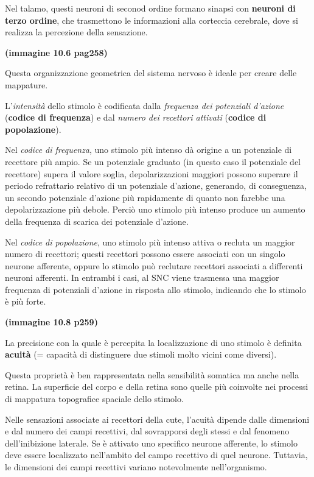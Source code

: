 \documentclass[]{article}
\begin{document}
Nel talamo, questi neuroni di seconod ordine formano sinapsi con
\textbf{neuroni di terzo ordine}, che trasmettono le informazioni alla
corteccia cerebrale, dove si realizza la percezione della sensazione.

\textbf{(immagine 10.6 pag258)}

Questa organizzazione geometrica del sistema nervoso è ideale per creare
delle mappature.

L'\emph{intensità} dello stimolo è codificata dalla \emph{frequenza dei
potenziali d'azione} (\textbf{codice di frequenza}) e dal \emph{numero
dei recettori attivati} (\textbf{codice di popolazione}).

Nel \emph{codice di frequenza}, uno stimolo più intenso dà origine a un
potenziale di recettore più ampio. Se un potenziale graduato (in questo
caso il potenziale del recettore) supera il valore soglia,
depolarizzazioni maggiori possono superare il periodo refrattario
relativo di un potenziale d'azione, generando, di conseguenza, un
secondo potenziale d'azione più rapidamente di quanto non farebbe una
depolarizzazione più debole. Perciò uno stimolo più intenso produce un
aumento della frequenza di scarica dei potenziale d'azione.

Nel \emph{codice di popolazione}, uno stimolo più intenso attiva o
recluta un maggior numero di recettori; questi recettori possono essere
associati con un singolo neurone afferente, oppure lo stimolo può
reclutare recettori associati a differenti neuroni afferenti. In
entrambi i casi, al SNC viene trasmessa una maggior frequenza di
potenziali d'azione in risposta allo stimolo, indicando che lo stimolo è
più forte.

\textbf{(immagine 10.8 p259)}

La precisione con la quale è percepita la localizzazione di uno stimolo
è definita \textbf{acuità} (= capacità di distinguere due stimoli molto
vicini come diversi).

Questa proprietà è ben rappresentata nella sensibilità somatica ma anche
nella retina. La superficie del corpo e della retina sono quelle più
coinvolte nei processi di mappatura topografice spaciale dello stimolo.

Nelle sensazioni associate ai recettori della cute, l'acuità dipende
dalle dimensioni e dal numero dei campi recettivi, dal sovrapporsi degli
stessi e dal fenomeno dell'inibizione laterale. Se è attivato uno
specifico neurone afferente, lo stimolo deve essere localizzato
nell'ambito del campo recettivo di quel neurone. Tuttavia, le dimensioni
dei campi recettivi variano notevolmente nell'organismo.
\end{document}
